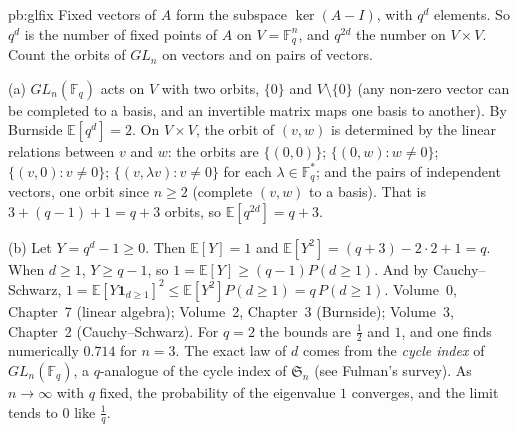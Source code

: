 \begin{solution}{pb:glfix}
\idea Fixed vectors of $A$ form the subspace $\ker(A-I)$, with $q^d$ elements. So $q^d$ is the number of fixed points of $A$ on
$V=\mathbb F_q^n$, and $q^{2d}$ the number on $V\times V$. Count the orbits of $GL_n$ on vectors and on pairs of vectors.

\writeup (a) $GL_n(\mathbb F_q)$ acts on $V$ with two orbits, $\{0\}$ and $V\setminus\{0\}$ (any non-zero vector can be completed
to a basis, and an invertible matrix maps one basis to another). By Burnside $\mathbb E[q^d]=2$. On $V\times V$, the orbit of
$(v,w)$ is determined by the linear relations between $v$ and $w$: the orbits are $\{(0,0)\}$; $\{(0,w):w\ne0\}$; $\{(v,0):v\ne0\}$;
$\{(v,\lambda v):v\ne0\}$ for each $\lambda\in\mathbb F_q^*$; and the pairs of independent vectors, one orbit since $n\ge2$ (complete
$(v,w)$ to a basis). That is $3+(q-1)+1=q+3$ orbits, so $\mathbb E[q^{2d}]=q+3$.

(b) Let $Y=q^d-1\ge0$. Then $\mathbb E[Y]=1$ and $\mathbb E[Y^2]=(q+3)-2\cdot2+1=q$. When $d\ge1$, $Y\ge q-1$, so
$1=\mathbb E[Y]\ge(q-1)P(d\ge1)$. And by Cauchy--Schwarz, $1=\mathbb E[Y\mathbf 1_{d\ge1}]^2\le\mathbb E[Y^2]P(d\ge1)=q\,P(d\ge1)$.
\tools Volume~0, Chapter~7 (linear algebra); Volume~2, Chapter~3 (Burnside); Volume~3, Chapter~2 (Cauchy--Schwarz).
\leads For $q=2$ the bounds are $\frac12$ and $1$, and one finds numerically $0.714$ for $n=3$. The exact law of $d$ comes from the
\emph{cycle index} of $GL_n(\mathbb F_q)$, a $q$-analogue of the cycle index of $\mathfrak S_n$ (see Fulman's survey). As
$n\to\infty$ with $q$ fixed, the probability of the eigenvalue $1$ converges, and the limit tends to $0$ like $\frac1q$.
\end{solution}

